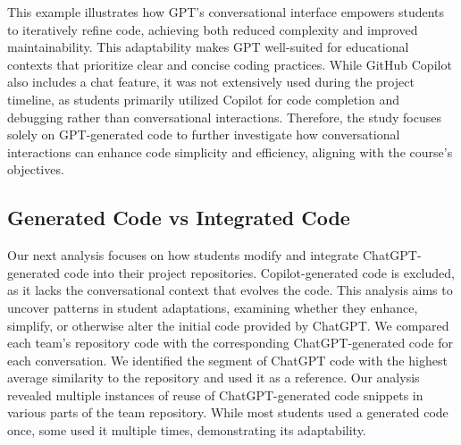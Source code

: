 This example illustrates how GPT's conversational interface empowers students to iteratively refine code, achieving both reduced complexity and improved maintainability. This adaptability makes GPT well-suited for educational contexts that prioritize clear and concise coding practices. While GitHub Copilot also includes a chat feature, it was not extensively used during the project timeline, as students primarily utilized Copilot for code completion and debugging rather than conversational interactions. Therefore, the study focuses solely on GPT-generated code to further investigate how conversational interactions can enhance code simplicity and efficiency, aligning with the course's objectives.

\subsection{Generated Code vs Integrated Code}
Our next analysis focuses on how students modify and integrate ChatGPT-generated code into their project repositories. Copilot-generated code is excluded, as it lacks the conversational context that evolves the code. This analysis aims to uncover patterns in student adaptations, examining whether they enhance, simplify, or otherwise alter the initial code provided by ChatGPT. We compared each team's repository code with the corresponding ChatGPT-generated code for each conversation. We identified the segment of ChatGPT code with the highest average similarity to the repository and used it as a reference. Our analysis revealed multiple instances of reuse of ChatGPT-generated code snippets in various parts of the team repository. While most students used a generated code once, some used it multiple times, demonstrating its adaptability.


